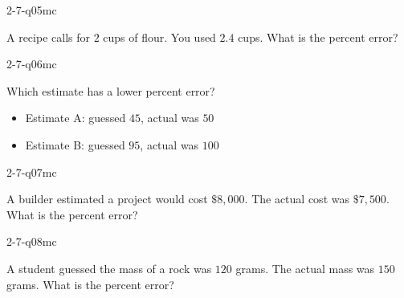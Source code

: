 \begin{practiceQuestion}{2-7-q05}{mc}
\begin{questionText}
A recipe calls for $2$ cups of flour. You used $2.4$ cups. What is the percent error?
\end{questionText}
\end{practiceQuestion}

\begin{practiceQuestion}{2-7-q06}{mc}
\begin{questionText}
Which estimate has a lower percent error?
\begin{itemize}
    \item Estimate A: guessed $45$, actual was $50$
    \item Estimate B: guessed $95$, actual was $100$
\end{itemize}
\end{questionText}
\end{practiceQuestion}

\begin{practiceQuestion}{2-7-q07}{mc}
\begin{questionText}
A builder estimated a project would cost $\$8{,}000$. The actual cost was $\$7{,}500$. What is the percent error?
\end{questionText}
\end{practiceQuestion}

\begin{practiceQuestion}{2-7-q08}{mc}
\begin{questionText}
A student guessed the mass of a rock was $120$ grams. The actual mass was $150$ grams. What is the percent error?
\end{questionText}
\end{practiceQuestion}

